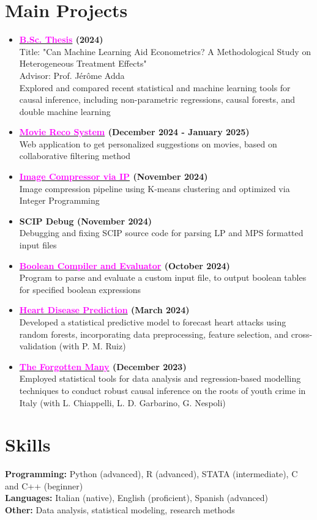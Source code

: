 \documentclass[letterpaper,11pt]{article}
\newcommand{\resumeProjectItem}[2]{
  \item
  \textbf{\color{black}\small #1} \\
  {\footnotesize #2}
  \vspace{0.05cm}
}
\newcommand{\resumeSubHeadingListStart}{\begin{itemize}[leftmargin=0in, label={}]}
\newcommand{\resumeSubHeadingListEnd}{\end{itemize}}
\begin{document}
\section{Main Projects}
\resumeSubHeadingListStart
\resumeProjectItem{\href{https://matildedol.github.io/files/bscthesis.pdf}{\textcolor{magenta}{B.Sc. Thesis}} (2024)}{
    Title: "Can Machine Learning Aid Econometrics? A Methodological Study on Heterogeneous Treatment Effects" \\
    Advisor: Prof. Jérôme Adda \\
    Explored and compared recent statistical and machine learning tools for causal inference, including non-parametric regressions, causal forests, and double machine learning
}
\resumeProjectItem{\href{https://github.com/beatricecitterio/movie-recommendation.git}{\textcolor{magenta}{Movie Reco System}} (December 2024 - January 2025)}{
    Web application to get personalized suggestions on movies, based on collaborative filtering method
}
\resumeProjectItem{\href{https://github.com/matildedol/projects-bocconi.git}{\textcolor{magenta}{Image Compressor via IP}} (November 2024)}{
    Image compression pipeline using K-means clustering and optimized via Integer Programming 
}
 \resumeProjectItem{SCIP Debug (November 2024)}{
     Debugging and fixing SCIP source code for parsing LP and MPS formatted input files
 }
\resumeProjectItem{\href{https://github.com/matildedol/projects-bocconi.git}{\textcolor{magenta}{Boolean Compiler and Evaluator}}
(October 2024)}{
    Program to parse and evaluate a custom input file, to output boolean tables for specified boolean expressions
}
\resumeProjectItem{\href{https://matildedol.github.io/files/pred_heart_disease.pdf}{\textcolor{magenta}{Heart Disease Prediction}} (March 2024)}{
    Developed a statistical predictive model to forecast heart attacks using random forests, incorporating data preprocessing, feature selection, and cross-validation (with P. M. Ruiz)
}
\resumeProjectItem{\href{https://matildedol.github.io/files/the_forgotten_many.pdf}{\textcolor{magenta}{The Forgotten Many}} (December 2023)}{
    Employed statistical tools for data analysis and regression-based modelling techniques to conduct robust causal inference on the roots of youth crime in Italy (with L. Chiappelli, L. D. Garbarino, G. Nespoli)
}
\resumeSubHeadingListEnd
\vspace*{-0.4cm}
\section{Skills}
\small
\textbf{Programming:} Python (advanced), R (advanced), STATA (intermediate), C and C++ (beginner) \\
\textbf{Languages:}  Italian (native), English (proficient), Spanish (advanced) \\
\textbf{Other:} Data analysis, statistical modeling, research methods
\end{document}
